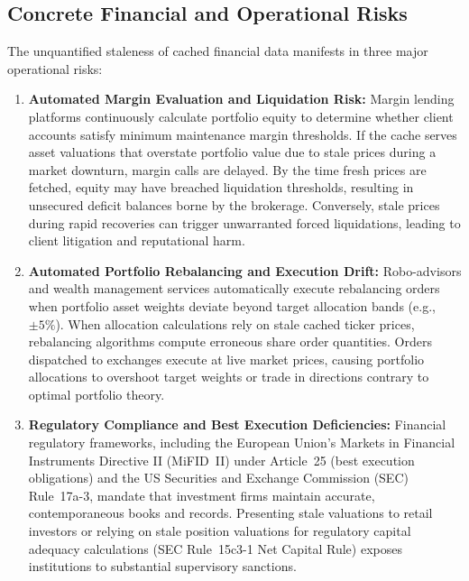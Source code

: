 \documentclass[11pt,a4paper]{article}
\begin{document}
\subsection{Concrete Financial and Operational Risks}

The unquantified staleness of cached financial data manifests in three major operational risks:

\begin{enumerate}[label=\textbf{\arabic*.}]
  \item \textbf{Automated Margin Evaluation and Liquidation Risk:} Margin lending platforms continuously calculate portfolio equity to determine whether client accounts satisfy minimum maintenance margin thresholds. If the cache serves asset valuations that overstate portfolio value due to stale prices during a market downturn, margin calls are delayed. By the time fresh prices are fetched, equity may have breached liquidation thresholds, resulting in unsecured deficit balances borne by the brokerage. Conversely, stale prices during rapid recoveries can trigger unwarranted forced liquidations, leading to client litigation and reputational harm.
  
  \item \textbf{Automated Portfolio Rebalancing and Execution Drift:} Robo-advisors and wealth management services automatically execute rebalancing orders when portfolio asset weights deviate beyond target allocation bands (e.g., $\pm 5\%$). When allocation calculations rely on stale cached ticker prices, rebalancing algorithms compute erroneous share order quantities. Orders dispatched to exchanges execute at live market prices, causing portfolio allocations to overshoot target weights or trade in directions contrary to optimal portfolio theory.
  
  \item \textbf{Regulatory Compliance and Best Execution Deficiencies:} Financial regulatory frameworks, including the European Union's Markets in Financial Instruments Directive II (MiFID~II) under Article~25 (best execution obligations) and the US Securities and Exchange Commission (SEC) Rule~17a-3, mandate that investment firms maintain accurate, contemporaneous books and records. Presenting stale valuations to retail investors or relying on stale position valuations for regulatory capital adequacy calculations (SEC Rule~15c3-1 Net Capital Rule) exposes institutions to substantial supervisory sanctions.
\end{enumerate}
\end{document}
